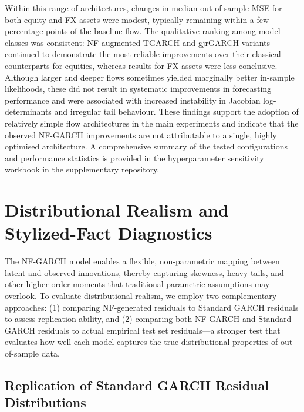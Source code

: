 \documentclass[oneside,12pt]{CUEDthesisPSnPDF}
\begin{document}
Within this range of architectures, changes in median out-of-sample MSE for both equity and FX assets were modest, typically remaining within a few percentage points of the baseline flow. The qualitative ranking among model classes was consistent: NF-augmented TGARCH and gjrGARCH variants continued to demonstrate the most reliable improvements over their classical counterparts for equities, whereas results for FX assets were less conclusive. Although larger and deeper flows sometimes yielded marginally better in-sample likelihoods, these did not result in systematic improvements in forecasting performance and were associated with increased instability in Jacobian log-determinants and irregular tail behaviour. These findings support the adoption of relatively simple flow architectures in the main experiments and indicate that the observed NF-GARCH improvements are not attributable to a single, highly optimised architecture. A comprehensive summary of the tested configurations and performance statistics is provided in the hyperparameter sensitivity workbook in the supplementary repository.\\


\section{Distributional Realism and Stylized-Fact Diagnostics}
\label{sec:dist_realism}
\noindent
The NF-GARCH model enables a flexible, non-parametric mapping between latent and observed innovations, thereby capturing skewness, heavy tails, and other higher-order moments that traditional parametric assumptions may overlook. To evaluate distributional realism, we employ two complementary approaches: (1) comparing NF-generated residuals to Standard GARCH residuals to assess replication ability, and (2) comparing both NF-GARCH and Standard GARCH residuals to actual empirical test set residuals---a stronger test that evaluates how well each model captures the true distributional properties of out-of-sample data.\\

\subsection{Replication of Standard GARCH Residual Distributions}
\label{subsec:replication}
\end{document}

